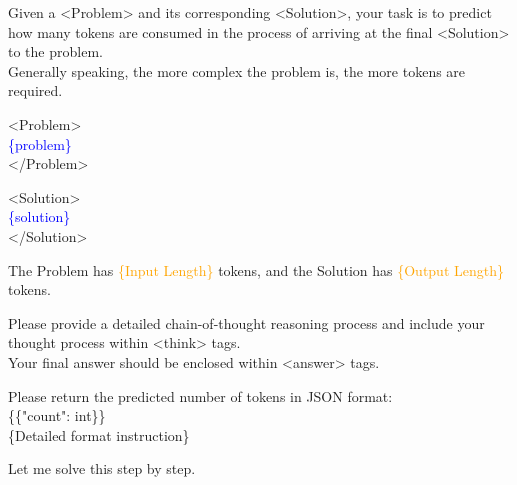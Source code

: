 \documentclass[border=2pt]{standalone}
\begin{document}
\begin{minipage}{5.4in}
\begin{tcolorbox}[colback=white!98!gray,
                  colframe=black!80,
                  width=\linewidth,
                  sharp corners=south,
                  boxrule=0.4pt]
\small
\ttfamily
Given a <Problem> and its corresponding <Solution>, your task is to predict how many tokens are consumed in the process of arriving at the final <Solution> to the problem.\\
Generally speaking, the more complex the problem is, the more tokens are required.

\vspace{0.5em}
<Problem>\\
\textcolor{blue}{\{problem\}}\\
</Problem>

\vspace{0.5em}
<Solution>\\
\textcolor{blue}{\{solution\}}\\
</Solution>

\vspace{0.5em}
The Problem has \textcolor{orange}{\{Input Length\}} tokens, and the Solution has \textcolor{orange}{\{Output Length\}} tokens.

\vspace{0.5em}
Please provide a detailed chain-of-thought reasoning process and include your thought process within <think> tags.\\
Your final answer should be enclosed within <answer> tags.

\vspace{0.5em}
Please return the predicted number of tokens in JSON format:\\
\{\{"count": int\}\} \\

\vspace{0.5em}
\{Detailed format instruction\}

\vspace{0.5em}
Let me solve this step by step.
\end{tcolorbox}
\end{minipage}
\end{document}
